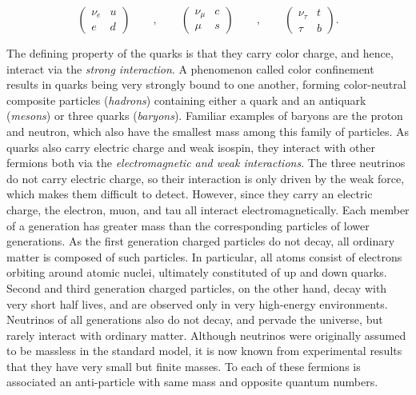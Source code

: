 \[
\begin{pmatrix}
  \nu_e & u \\ e & d
\end{pmatrix}
\qquad
,
\qquad
\begin{pmatrix}
  \nu_\mu & c \\ \mu & s
\end{pmatrix}
\qquad
,
\qquad
\begin{pmatrix}
  \nu_\tau & t \\ \tau & b
\end{pmatrix}.
\]

The defining property of the quarks is that they carry color charge, and hence, interact via the \textit{strong interaction}.
A phenomenon called color confinement results in quarks being very strongly bound to one another, forming color-neutral composite particles (\textit{hadrons})
containing either a quark and an antiquark (\textit{mesons}) or three quarks (\textit{baryons}).
Familiar examples of baryons are the proton and neutron, which also have the smallest mass among this family of particles.
As quarks also carry electric charge and weak isospin, they interact with other fermions both via the \textit{electromagnetic and weak interactions}.
The three neutrinos do not carry electric charge, so their interaction is only driven by the weak force, which makes them difficult to detect.
However, since they carry an electric charge, the electron, muon, and tau all interact electromagnetically.
Each member of a generation has greater mass than the corresponding particles of lower generations.
As the first generation charged particles do not decay, all ordinary matter is composed of such particles.
In particular, all atoms consist of electrons orbiting around atomic nuclei, ultimately constituted of up and down quarks.
Second and third generation charged particles, on the other hand, decay with very short half lives, and are observed only in very high-energy environments.
Neutrinos of all generations also do not decay, and pervade the universe, but rarely interact with ordinary matter.
Although neutrinos were originally assumed to be massless in the standard model, it is now known from experimental results that they have very small but finite masses.
To each of these fermions is associated an anti-particle with same mass and opposite quantum numbers.

